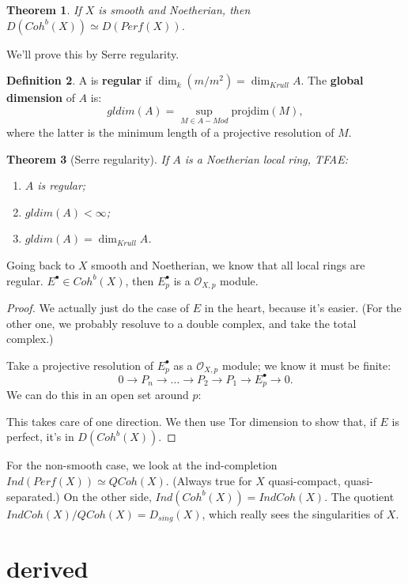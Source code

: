 \documentclass[10pt,a4paper,reqno,oneside]{book} %
\theoremstyle{plain}
\newtheorem{thm}{Theorem}[section]
\theoremstyle{definition}
\newtheorem{defin}[thm]{Definition}
\theoremstyle{remark}
\numberwithin{equation}{section}
\begin{document}
\begin{thm}
If $X$ is smooth and Noetherian, then $D(Coh^b(X)) \simeq D(Perf(X))$.
\end{thm}

We'll prove this by Serre regularity.

\begin{defin}
A is \textbf{regular} if $\dim_k(m/m^2) = \dim_{Krull} A$. The \textbf{global dimension} of $A$ is:
\[	gldim(A) = \sup_{M \in A-Mod} \text{projdim}(M),	\]
where the latter is the minimum length of a projective resolution of $M$.
\end{defin}

\begin{thm}[Serre regularity]
If $A$ is a Noetherian local ring, TFAE:
\begin{enumerate}
\item $A$ is regular;
\item $gldim(A) < \infty$;
\item $gldim(A) = \dim_{Krull}A$.
\end{enumerate}
\end{thm}

Going back to $X$ smooth and Noetherian, we know that all local rings are regular. $E^{\bullet} \in Coh^b(X)$, then
$E^{\bullet}_p$ is a $\mathcal{O}_{X,p}$ module. 

\begin{proof}
We actually just do the case of $E$ in the heart, because it's easier. (For the other one, we probably resoluve to a double
complex, and take the total complex.)

Take a projective resolution of $E^{\bullet}_p$ as a $\mathcal{O}_{X,p}$ module; we know it must be finite:
\[	0 \to P_n \to \dots \to P_2 \to P_1 \to E^{\bullet}_p \to 0.	\]
We can do this in an open set around $p$:

This takes care of one direction. We then use Tor dimension to show that, if $E$ is perfect, it's in $D(Coh^b(X))$.
\end{proof}

For the non-smooth case, we look at the ind-completion $Ind(Perf(X)) \simeq QCoh(X)$. (Always true for $X$ quasi-compact,
quasi-separated.) On the other side, $Ind(Coh^b(X)) = IndCoh(X)$. The quotient $IndCoh(X)/QCoh(X) = D_{sing}(X)$, which
really sees the singularities of $X$.


\section{derived}
\label{sect:perf_derived}
\end{document}
